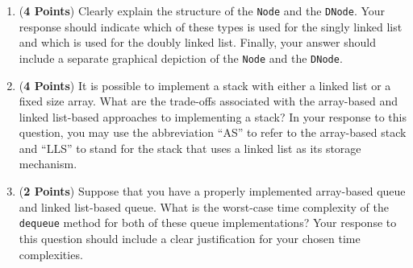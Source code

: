 \documentclass[12pt]{article}
\begin{document}
\begin{enumerate}
\begin{enumerate}

          \item ({\bf 4 Points}) Clearly explain the structure of the {\tt Node} and the {\tt DNode}.  Your response
            should indicate which of these types is used for the singly linked list and which is used for the doubly
            linked list.  Finally, your answer should include a separate graphical depiction of the {\tt Node} and the
            {\tt DNode}.


          \item ({\bf 4 Points}) It is possible to implement a stack with either a linked list or a fixed size array.
            What are the trade-offs associated with the array-based and linked list-based approaches to implementing a
            stack?  In your response to this question, you may use the abbreviation ``AS'' to refer to the array-based
            stack and ``LLS'' to stand for the stack that uses a linked list as its storage mechanism.

          \item ({\bf 2 Points}) Suppose that you have a properly implemented array-based queue and linked list-based
            queue.  What is the worst-case time complexity of the {\tt dequeue} method for both of these queue
            implementations?  Your response to this question should include a clear justification for your chosen
            time complexities.



\end{enumerate}
\end{enumerate}
\end{document}
